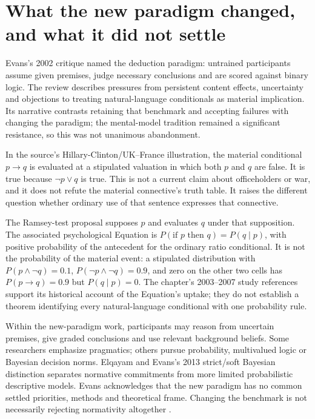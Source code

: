 \section{What the new paradigm changed, and what it did not settle}
\label{sec:p13-r12-conditional-semantics}

Evans's 2002 critique named the deduction paradigm: untrained participants
assume given premises, judge necessary conclusions and are scored against
binary logic.  The review describes pressures from persistent content effects,
uncertainty and objections to treating natural-language conditionals as
material implication.  Its narrative contrasts retaining that benchmark and
accepting failures with changing the paradigm; the mental-model tradition
remained a significant resistance, so this was not unanimous abandonment.

In the source's Hillary-Clinton/UK--France illustration, the material
conditional \(p\to q\) is evaluated at a stipulated valuation in which
both \(p\) and \(q\) are false.  It is true because \(\neg p\lor q\)
is true.  This is not a current claim about officeholders or war, and it
does not refute the material connective's truth table.  It raises the
different question whether ordinary use of that sentence expresses that
connective.

The Ramsey-test proposal supposes \(p\) and evaluates \(q\) under that
supposition.  The associated psychological Equation is
\(P(\text{if }p\text{ then }q)=P(q\mid p)\), with positive probability
of the antecedent for the ordinary ratio conditional.  It is not the
probability of the material event: a stipulated distribution with
\(P(p\land\neg q)=0.1\), \(P(\neg p\land\neg q)=0.9\), and
zero on the other two cells has \(P(p\to q)=0.9\) but
\(P(q\mid p)=0\).  The chapter's 2003--2007 study references support its
historical account of the Equation's uptake; they do not establish a theorem
identifying every natural-language conditional with one probability rule.

Within the new-paradigm work, participants may reason from uncertain premises,
give graded conclusions and use relevant background beliefs.  Some researchers
emphasize pragmatics; others pursue probability, multivalued logic or Bayesian
decision norms.  Elqayam and Evans's 2013 strict/soft Bayesian distinction
separates normative commitments from more limited probabilistic descriptive
models.  Evans acknowledges that the new paradigm has no common settled
priorities, methods and theoretical frame.  Changing the benchmark is not
necessarily rejecting normativity altogether
\parencite[p.~95]{Evans2021RationalityDebate}.

